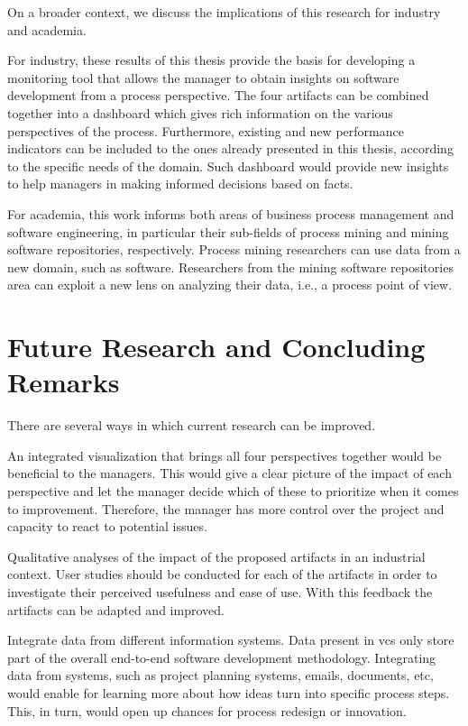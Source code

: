 On a broader context, we discuss the implications of this research for industry and academia. 

For industry, these results of this thesis provide the basis for developing a monitoring tool that allows the manager to obtain insights on software development from a process perspective. The four artifacts can be combined together into a dashboard which gives rich information on the various perspectives of the process. Furthermore, existing and new performance indicators can be included to the ones already presented in this thesis, according to the specific needs of the domain. Such dashboard would provide new insights to help managers in making informed decisions based on facts. 

For academia, this work informs both areas of business process management and software engineering, in particular their sub-fields of process mining and mining software repositories, respectively. Process mining researchers can use data from a new domain, such as software. Researchers from the mining software repositories area can exploit a new lens on analyzing their data, i.e., a process point of view. 


\section{Future Research and Concluding Remarks}
\label{sec:8-future}

There are several ways in which current research can be improved. 

An integrated visualization that brings all four perspectives together would be beneficial to the managers. This would give a clear picture of the impact of each perspective and let the manager decide which of these to prioritize when it comes to improvement. Therefore, the manager has more control over the project and capacity to react to potential issues. 

Qualitative analyses of the impact of the proposed artifacts in an industrial context. User studies should be conducted for each of the artifacts in order to investigate their perceived usefulness and ease of use. With this feedback the artifacts can be adapted and improved. 

Integrate data from different information systems. Data present in \gls{vcs} only store part of the overall end-to-end software development methodology. Integrating data from systems, such as project planning systems, emails, documents, etc, would enable for learning more about how ideas turn into specific process steps. This, in turn, would open up chances for process redesign or innovation. 




